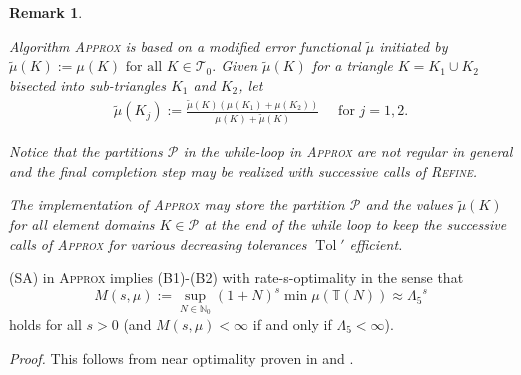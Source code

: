 \documentclass{siamltex1213}
\newtheorem{remark}{Remark}
\begin{document}
\begin{remark}
	\begin{inparaenum}[(a)]
	\item Algorithm {{\scshape Approx}\xspace} is based on a modified error functional $\tilde \mu$ initiated by
$
	\tilde \mu (K):= \mu(K) \text{ for all } K \in {\mathcal T_{0}}. 
$
Given $\tilde \mu(K)$ for a triangle $K=K_1\cup K_2$ bisected  
into sub-triangles $K_1$ and $K_2$, let 
\begin{align}	
	\tilde \mu (K_j):= \frac{\tilde \mu (K)( \mu(K_1)+ \mu(K_2))}{\mu(K) + \tilde \mu (K)}
	\quad\text{ for } j=1,2 .\label{eq:tmu2}
\end{align}
\item 
Notice that the partitions ${\mathcal{P}}$ in the while-loop in  {{\scshape Approx}\xspace} 
are not regular in general and the final completion step may be 
realized with  successive calls of 
\textsc{Refine}.
\\
\item The implementation of {{\scshape Approx}\xspace} may store the partition ${\mathcal{P}}$ and the values
$\tilde \mu(K)$ for all element domains $K\in{\mathcal{P}}$ at the end of the while loop to keep the successive calls of {{\scshape Approx}\xspace} for various decreasing tolerances $\operatorname{Tol}'$ efficient.
\end{inparaenum}
\end{remark}

\medskip

\begin{theorem}\label{thm:optimalityofApprox}
(SA) in  {{\scshape Approx}\xspace} implies  (B1)-(B2) with rate-s-optimality in the sense that
\begin{equation}\label{eqdefM(s,mu)}
M(s,\mu):=\sup_{N\in {\mathbb{N}_0}} (1+N)^s \min \mu({\mathbb T\left({N}\right)}) \approx {\ensuremath{\Lambda_{\mathrm{5}}}}^s
\end{equation}
holds for all $s>0$ (and $M(s,\mu)<\infty$ if and only if $ {\ensuremath{\Lambda_{\mathrm{5}}}}<\infty$).
\end{theorem}

\textit{Proof.}
This follows from near optimality proven in  \cite[Theorem 6.1]{BD04} and 
\cite[Lemma 4.4]{BDD04}. 
\qquad\endproof
\end{document}
